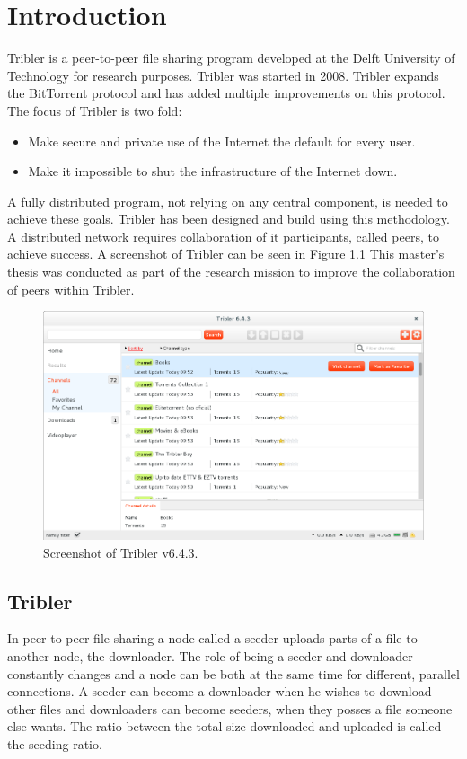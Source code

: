 \chapter{Introduction}
\label{chp:introduction}
Tribler is a peer-to-peer file sharing program developed at the Delft University of Technology for research purposes.
Tribler was started in 2008.
Tribler expands the BitTorrent protocol and has added multiple improvements on this protocol.
The focus of Tribler is two fold:
\begin{itemize}
    \item Make secure and private use of the Internet the default for every user.
    \item Make it impossible to shut the infrastructure of the Internet down.
\end{itemize}

A fully distributed program, not relying on any central component, is needed to achieve these goals.
Tribler has been designed and build using this methodology\cite{Pouwelse-tribler}\cite{Bakker-tribler}.
A distributed network requires collaboration of it participants, called peers, to achieve success.
A screenshot of Tribler can be seen in Figure \ref{fig:tribler-screenshot}
This master's thesis was conducted as part of the research mission to improve the collaboration of peers within Tribler.

\begin{figure}
	\centerline{\includegraphics[scale=0.3]{introduction/figs/tribler-screenshot.png}}
	\caption{Screenshot of Tribler v6.4.3.}
	\label{fig:tribler-screenshot}
\end{figure}

\section{Tribler}
In peer-to-peer file sharing a node called a seeder uploads parts
of a file to another node, the downloader.
The role of being a seeder and downloader constantly changes
and a node can be both at the same time for different, parallel connections.
A seeder can become a downloader when he wishes to download other files
and downloaders can become seeders,
when they posses a file someone else wants.
The ratio between the total size downloaded and uploaded is called the seeding ratio\cite{Cohen-bittorrent}.

